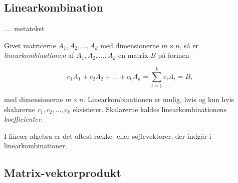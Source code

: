 \subsection{Linearkombination}

.... metatekst

\begin{defn}{}{}
Givet matricerne $A_1, A_2, \ldots, A_k$ med dimensionerne $m \times n$, så er \textit{linearkombinationen} af $A_1, A_2, \ldots, A_k$ en matrix $B$ på formen 

$$c_1A_1+c_2A_2+\ldots+c_kA_k=\sum\limits_{i=1}^k c_iA_i=B,$$

med dimensionerne $m \times n$. 
Linearkombinationen er mulig, hvis og kun hvis skalarerne $c_1, c_2, \ldots, c_k$ eksisterer. 
Skalarerne kaldes linearkombinationens \textit{koefficienter}.
\end{defn}

I lineær algebra er det oftest række- eller søjlevektorer, der indgår i linearkombinationer. 







\subsection{Matrix-vektorprodukt}

\begin{defn}{}{}

\end{defn}